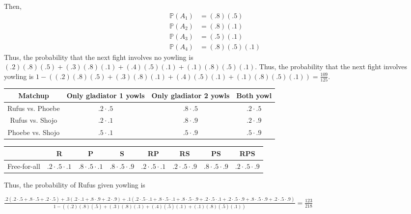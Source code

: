 \documentclass[12pt]{article}
\begin{document}
    Then,
    \begin{align*}
        \mathbb P(A_1) &= (.8)(.5) \\
        \mathbb P(A_2) &= (.8)(.1) \\
        \mathbb P(A_3) &= (.5)(.1) \\
        \mathbb P(A_4) &= (.8)(.5)(.1)
    \end{align*}
    Thus, the probability that the next fight involves no yowling is $(.2)(.8)(.5) + (.3)(.8)(.1) + (.4)(.5)(.1) + (.1)(.8)(.5)(.1)$. Thus, the probability that the next fight involves yowling is $1 - ((.2)(.8)(.5) + (.3)(.8)(.1) + (.4)(.5)(.1) + (.1)(.8)(.5)(.1)) = \frac{109}{125}$.

\medskip
{}
    
    \begin{tabular}{c | c | c | c}
        Matchup          & Only gladiator 1 yowls & Only gladiator 2 yowls & Both yowl \\
        \hline
        Rufus vs. Phoebe & $.2 \cdot .5$    & $.8 \cdot .5$    & $.2 \cdot .5$ \\
        Rufus vs. Shojo  & $.2 \cdot .1$    & $.8 \cdot .9$    & $.2 \cdot .9$ \\
        Phoebe vs. Shojo & $.5 \cdot .1$    & $.5 \cdot .9$    & $.5 \cdot .9$
    \end{tabular}
    
    \medskip
    \begin{tabular}{c | c | c | c | c | c | c | c}
        & R & P & S & RP & RS & PS & RPS \\
        \hline
        Free-for-all & $.2 \cdot .5 \cdot .1$ & $.8 \cdot .5 \cdot .1$ & $.8 \cdot .5 \cdot .9$ & $.2 \cdot .5 \cdot .1$ & $.2 \cdot .5 \cdot .9$ & $.8 \cdot .5 \cdot .9$ & $.2 \cdot .5 \cdot .9$
    \end{tabular}

    \medskip
    Thus, the probability of Rufus given yowling is
    
    \medskip
    \begin{centering}
    $\frac{.2(.2\cdot.5 + .8\cdot.5 + .2\cdot.5) + .3(.2\cdot.1 + .8\cdot.9 + .2\cdot.9) + .1(.2\cdot.5\cdot.1 + .8\cdot.5\cdot.1 + .8\cdot.5\cdot.9 + .2\cdot.5\cdot.1 + .2\cdot.5\cdot.9 + .8\cdot.5\cdot.9 + .2\cdot.5\cdot.9)}{1 - ((.2)(.8)(.5) + (.3)(.8)(.1) + (.4)(.5)(.1) + (.1)(.8)(.5)(.1))} = \frac{123}{218}$
    \end{centering}

\newpage
{}
\end{document}
